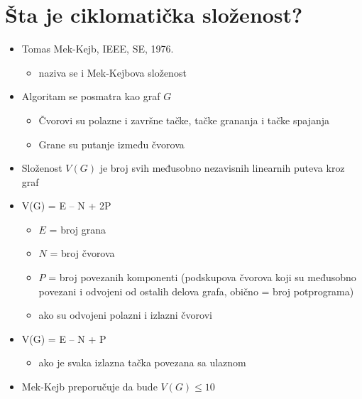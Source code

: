 \documentclass[a4paper]{article}
\begin{document}
\section{Šta je ciklomatička složenost?}
\begin{itemize}
  \item Tomas Mek-Kejb, IEEE, SE, 1976.
    \begin{itemize}
      \item naziva se i Mek-Kejbova složenost
    \end{itemize}
  \item Algoritam se posmatra kao graf \(G\)
    \begin{itemize}
      \item Čvorovi su polazne i završne tačke, tačke grananja i tačke spajanja
      \item Grane su putanje između čvorova
    \end{itemize}
  \item Složenost \(V(G)\) je broj svih međusobno nezavisnih linearnih puteva kroz graf
      \item V(G) = E – N + 2P
    \begin{itemize}
      \item \(E\) = broj grana
      \item \(N\) = broj čvorova
      \item \(P\) = broj povezanih komponenti (podskupova čvorova koji su međusobno povezani i odvojeni od ostalih delova grafa, obično = broj potprograma) 
      \item ako su odvojeni polazni i izlazni čvorovi
     \end{itemize}
      \item V(G) = E – N + P\
	\begin{itemize}
      \item ako je svaka izlazna tačka povezana sa ulaznom
	\end{itemize}
  \item Mek-Kejb preporučuje da bude \(V(G) \leq 10\)
\end{itemize}
\end{document}
